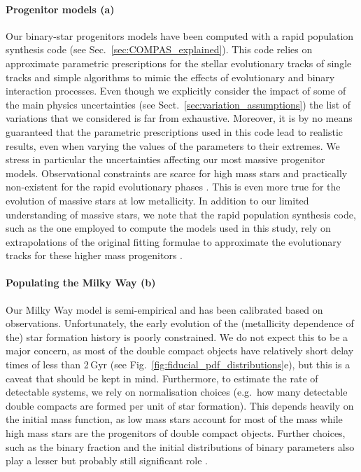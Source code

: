 \paragraph{Progenitor models (a)} Our binary-star progenitors models have been computed with a rapid population synthesis code (see Sec.~\ref{sec:COMPAS_explained}). This code relies on approximate parametric prescriptions for the stellar evolutionary tracks of single tracks and simple algorithms to mimic the effects of evolutionary and binary interaction  processes. Even though we explicitly consider the impact of some of the main physics uncertainties (see Sect.~\ref{sec:variation_assumptions}) the list of variations that we considered is far from exhaustive. Moreover, it is by no means guaranteed that the parametric prescriptions used in this code lead to realistic results, even when varying the values of the parameters to their extremes. We stress in particular the uncertainties affecting our most massive progenitor models. Observational constraints are scarce for high mass stars and practically non-existent for the rapid evolutionary phases \citep[e.g.\ ][]{Langer2012, Mapelli+2021}. This is even more true for the evolution of massive stars at low metallicity. In addition to our limited understanding of massive stars, we note that the rapid population synthesis code, such as the one employed to compute the models used in this study, rely on extrapolations of the original fitting formulae to approximate the evolutionary tracks for these higher mass progenitors \citep{Hurley+2000,Hurley+2002}. 
 
\paragraph{Populating the Milky Way (b)} Our Milky Way model is semi-empirical and has been calibrated based on observations. Unfortunately, the early evolution of the (metallicity dependence of the) star formation history is poorly constrained. We do not expect this to be a major concern, as most of the double compact objects have relatively short delay times of less than 2\,Gyr (see Fig.~\ref{fig:fiducial_pdf_distributions}e), but this is a caveat that should be kept in mind. Furthermore, to estimate the rate of detectable systems, we rely on normalisation choices (e.g.\ how many detectable double compacts are formed per unit of star formation). This depends heavily on the initial mass function, as low mass stars account for most of the mass while high mass stars are the progenitors of double compact objects. Further choices, such as the binary fraction and the initial distributions of binary parameters also play a lesser but probably still significant role \citet[e.g.\ ][]{deMink+2015, Chruslinska+2017, Klencki+2018}. 

